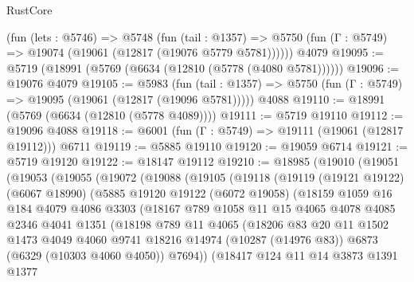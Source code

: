 \begin{lexlean}{RustCore}
\begin{coremodule}
    (fun (lets : @5746) =>
    @5748
      (fun (tail : @1357) =>
      @5750 (fun (Γ : @5749) => @19074 (@19061 (@12817 (@19076 @5779 @5781))))))
    @4079
@19095 := @5719 (@18991 (@5769 (@6634 (@12810 (@5778 (@4080 @5781))))))
@19096 := @19076 @4079
@19105 := @5983
    (fun (tail : @1357) => @5750 (fun (Γ : @5749) => @19095 (@19061 (@12817 (@19096 @5781)))))
    @4088
@19110 := @18991 (@5769 (@6634 (@12810 (@5778 @4089))))
@19111 := @5719 @19110
@19112 := @19096 @4088
@19118 := @6001 (fun (Γ : @5749) => @19111 (@19061 (@12817 @19112))) @6711
@19119 := @5885 @19110
@19120 := @19059 @6714
@19121 := @5719 @19120
@19122 := @18147 @19112
@19210 := @18985
    (@19010
      (@19051
        (@19053
          (@19055
            (@19072
              (@19088
                (@19105
                  (@19118
                    (@19119
                      (@19121 @19122)
                      (@6067 @18990)
                      (@5885
                        @19120
                        @19122
                        (@6072 @19058)
                        (@18159
                          @1059
                          @16
                          @184
                          @4079
                          @4086
                          @3303
                          (@18167
                            @789
                            @1058
                            @11
                            @15
                            @4065
                            @4078
                            @4085
                            @2346
                            @4041
                            @1351
                            (@18198
                              @789
                              @11
                              @4065
                              (@18206
                                @83
                                @20
                                @11
                                @1502
                                @1473
                                @4049
                                @4060
                                @9741
                                @18216
                                @14974
                                (@10287 (@14976 @83))
                                @6873
                                (@6329 (@10303 @4060 @4050))
                                @7694))
                            (@18417
                              @124
                              @11
                              @14
                              @3873
                              @1391
                              @1377

\end{coremodule}
\end{lexlean}
